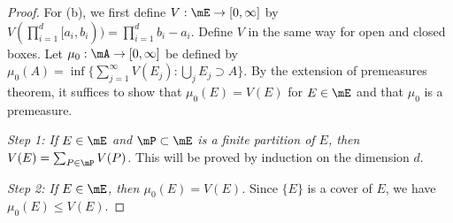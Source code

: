 \documentclass{article}
\begin{document}
\begin{proof}
For (b), we first define $V : \mE \to [0, \infty]$ by $V(\prod_{i=1}^d [a_i, b_i)) = \prod_{i=1}^d b_i - a_i$. Define $V$ in the same way for open and closed boxes. Let $\mu_0: \mA \to [0, \infty]$ be defined by $\mu_0(A) = \inf \{\sum_{j=1}^\infty V(E_j) : \bigcup_j E_j \supset A \}$. By the extension of premeasures theorem, it suffices to show that $\mu_0(E) = V(E)$ for $E \in \mE$ and that $\mu_0$ is a premeasure.

\emph{Step 1: If $E \in \mE$ and $\mP \subset \mE$ is a finite partition of $E$, then $V(E) = \sum_{P \in \mP} V(P)$.}  This will be proved by induction on the dimension $d$. 






\emph{Step 2: If $E \in \mE$, then $\mu_0(E) = V(E)$.} Since $\{E\}$ is a cover of $E$, we have $\mu_0(E) \le V(E)$.


\end{proof}
\end{document}
